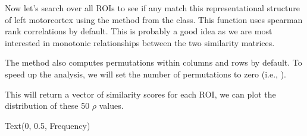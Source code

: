 \documentclass[letterpaper,10pt,english]{sphinxmanual}
\begin{document}
\noindent{}

Now let’s search over all ROIs to see if any match this representational structure of left motor\sphinxhyphen{}cortex using the  method from the  class. This function uses spearman rank correlations by default. This is probably a good idea as we are most interested in monotonic relationships between the two similarity matrices.

The  method also computes permutations within columns and rows by default. To speed up the analysis, we will set the number of permutations to zero (i.e., ).

\begin{sphinxVerbatim}[commandchars=\\\{\}]
  \PYG{p}{[}\PYG{p}{]}
   
        
    \PYG{p}{[}\PYG{p}{]}
\end{sphinxVerbatim}

This will return a vector of similarity scores for each ROI, we can plot the distribution of these 50 \(\rho\) values.

\begin{sphinxVerbatim}[commandchars=\\\{\}]
 
 
\end{sphinxVerbatim}

\begin{sphinxVerbatim}[commandchars=\\\{\}]
Text(0, 0.5, \PYGZsq{}Frequency\PYGZsq{})
\end{sphinxVerbatim}
\end{document}
